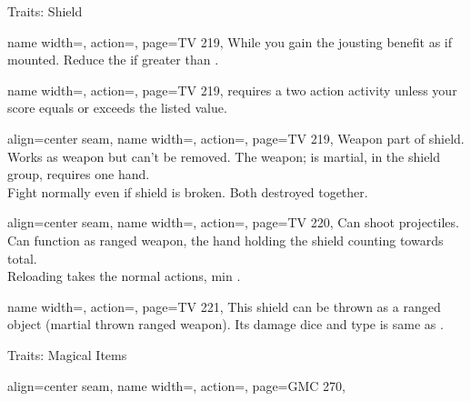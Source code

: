 \begin{PageBackLandscape}
\begin{TablesHalf}{\backTableHeight}
\begin{Table}{Traits: Shield}
\begin{entry}{}{%
                name width=\conditionLength,%
                action=\Harnessed,
                page=TV 219,
            }
                While  you gain the jousting benefit as if mounted.
                Reduce the   \Feet if greater than  \Feet.
            \end{entry}
            \begin{entry}{}{%
                name width=\conditionLength,%
                action=\Hefty,
                page=TV 219,
            }
                 requires a two action activity unless your \Strength score equals or exceeds the listed value.
            \end{entry}
            \begin{entry}{}{%
                align=center seam,
                name width=\conditionLength,%
                action=\Integrated,
                page=TV 219,
            }
                Weapon part of shield.
                Works as  weapon but can't be removed.
                The weapon; is martial, in the shield group, requires one hand. \\
                Fight normally even if shield is broken.
                Both destroyed together.
            \end{entry}
            \begin{entry}{}{%
                align=center seam,
                name width=\conditionLength,%
                action=\Launching,
                page=TV 220,
            }
                Can shoot projectiles. Can function as ranged weapon, the hand holding the shield counting towards total.\\
                Reloading takes the normal  actions, min .
            \end{entry}
            \begin{entry}{}{%
                name width=\conditionLength,%
                action=\ShieldThrow,
                page=TV 221,
            }
                This shield can be thrown as a ranged object (martial thrown ranged weapon).
                Its damage dice and type is same as .
            \end{entry}
        \end{Table}
        \TableSpace
        \begin{Table}{Traits: Magical Items}
            \begin{entry}{}{%
                align=center seam,
                name width=\conditionLength,%
                action=\Apex,
                page=GMC 270,
            }

\end{entry}
\end{Table}
\end{TablesHalf}
\end{PageBackLandscape}

